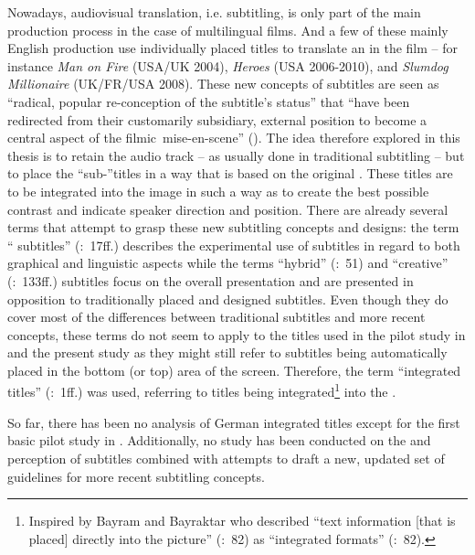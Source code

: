 Nowadays, audiovisual translation, i.e. subtitling, is only part of the main production process in the case of multilingual films. And a few of these mainly English production use individually placed titles to translate an  in the film – for instance \textit{Man on Fire} (USA/UK 2004), \textit{Heroes} (USA 2006-2010), and \textit{Slumdog Millionaire} (UK/FR/USA 2008). These new concepts of subtitles are seen as “radical, popular re-conception of the subtitle's status” \citep{Kofoed2011} that “have been redirected from their customarily subsidiary, external position to become a central aspect of the filmic~mise-en-scene” (\citealt{Kofoed2011}). The idea therefore explored in this thesis is to retain the audio track – as usually done in traditional subtitling – but to place the “sub-”titles in a way that is based on the original . These titles are to be integrated into the image in such a way as to create the best possible contrast and indicate speaker direction and position. There are already several terms that attempt to grasp these new subtitling concepts and designs: the term  “ subtitles” (\citealt{nornes1999}:~17ff.) describes the experimental use of subtitles in regard to both graphical and linguistic aspects while the terms “hybrid” (\citealt{Diaz_cintas2006}:~51) and “creative” (\citealt{mcclarty2012}:~133ff.) subtitles focus on the overall presentation and are presented in opposition to traditionally placed and designed subtitles. Even though they do cover most of the differences between traditional subtitles and more recent concepts, these terms do not seem to apply to the titles used in the pilot study in \citet{Fox2012} and the present study as they might still refer to subtitles being automatically placed in the bottom (or top) area of the screen. Therefore, the term “integrated titles” (\citealt{Fox2012}:~1ff.) was used, referring to titles being integrated\footnote{Inspired by Bayram and Bayraktar who described “text information [that is placed] directly into the picture” (\citeyear{Bayram2012}:~82) as “integrated formats” (\citeyear{Bayram2012}:~82).} into the .


So far, there has been no  analysis of German integrated titles except for the first basic pilot study in \citet{Fox2012}. Additionally, no  study has been conducted on the  and perception of subtitles combined with attempts to draft a new, updated set of guidelines for more recent subtitling concepts.



